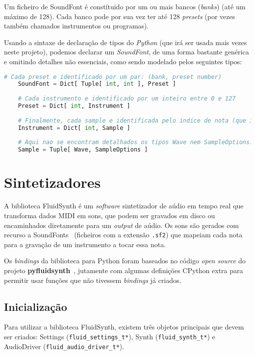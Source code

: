 Um ficheiro de SoundFont\cite{rossum1995soundfont} é constítuido por um ou mais bancos (\textit{banks}) (até um máximo de 128). Cada banco pode por sua vez ter até 128 \textit{presets} (por vezes também chamados instrumentos ou programas).

Usando a sintaxe de declaração de tipos do \textit{Python} (que irá ser usada mais vezes neste projeto), podemos declarar um \textit{SoundFont}, de uma forma bastante genérica e omitindo detalhes não essenciais, como sendo modelado pelos seguintes tipos:
\newpage
\begin{lstlisting}[caption=Sistema de Tipos de um ficheiro SoundFont,language=Python]
    # Cada preset e identificado por um par: (bank, preset number)
    SoundFont = Dict[ Tuple[ int, int ], Preset ]
    
    # Cada instrumento e identificado por um inteiro entre 0 e 127
    Preset = Dict[ int, Instrument ]
    
    # Finalmente, cada sample e identificada pelo indice de nota (que iremos abordar mais a frente em detalhe, no capitulo sobre sintetizadores)
    Instrument = Dict[ int, Sample ]
    
    # Aqui nao se encontram detalhados os tipos Wave nem SampleOptions.
    Sample = Tuple[ Wave, SampleOptions ]
\end{lstlisting}


\section{Sintetizadores}
A biblioteca FluidSynth é um \textit{software} sintetizador de aúdio em tempo real que transforma dados MIDI em sons, que podem ser gravados em disco ou encaminhados diretamente para um \textit{output} de aúdio. Os sons são gerados com recurso a SoundFonts~\cite{soundfont} (ficheiros com a extensão \texttt{.sf2}) que mapeiam cada nota para a gravação de um instrumento a tocar essa nota.

Os \textit{bindings} da biblioteca para Python foram baseados no código \textit{open source} do projeto \textbf{pyfluidsynth}~\cite{pyfluidsynth}, jutamente com algumas definições CPython extra para permitir usar funções que não tivessem \textit{bindings} já criados.

\subsection{Inicialização}
Para utilizar a biblioteca FluidSynth, existem três objetos principais que devem ser criados: Settings (\texttt{fluid\_settings\_t*}), Synth (\texttt{fluid\_synth\_t*}) e AudioDriver (\texttt{fluid\_audio\_driver\_t*}).

